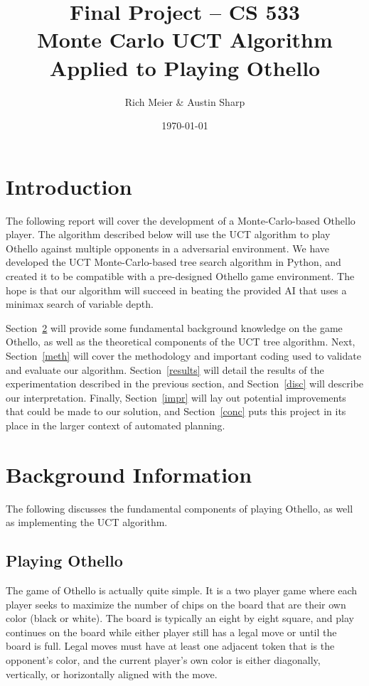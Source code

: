 \documentclass[12pt,letterpaper]{article}
\begin{document}
\title{\vspace{-1in}Final Project -- CS 533 \\ Monte Carlo UCT Algorithm Applied to Playing Othello}
\author{Rich Meier \& Austin Sharp}
\date{\today}
\maketitle

\vspace{-.5in}
\section{Introduction}
The following report will cover the development of a Monte-Carlo-based Othello player. The algorithm described below will use the UCT algorithm to play Othello against multiple opponents in a adversarial environment. We have developed the UCT Monte-Carlo-based tree search algorithm in Python, and created it to be compatible with a pre-designed Othello game environment. The hope is that our algorithm will succeed in beating the provided AI that uses a minimax search of variable depth.

Section~\ref{back} will provide some fundamental background knowledge on the game Othello, as well as the theoretical components of the UCT tree algorithm.  Next, Section~\ref{meth} will cover the methodology and important coding used to validate and evaluate our algorithm. Section~\ref{results} will detail the results of the experimentation described in the previous section, and Section~\ref{disc} will describe our interpretation. Finally, Section~\ref{impr} will lay out potential improvements that could be made to our solution, and Section~\ref{conc} puts this project in its place in the larger context of automated planning.

\section{Background Information}
\label{back}

The following discusses the fundamental components of playing Othello, as well as implementing the UCT algorithm.

\subsection{Playing Othello}

The game of Othello is actually quite simple. It is a two player game where each player seeks to maximize the number of chips on the board that are their own color (black or white). The board is typically an eight by eight square, and play continues on the board while either player still has a legal move or until the board is full. Legal moves must have at least one adjacent token that is the opponent's color, and the current player's own color is either diagonally, vertically, or horizontally aligned with the move.  
\end{document}
